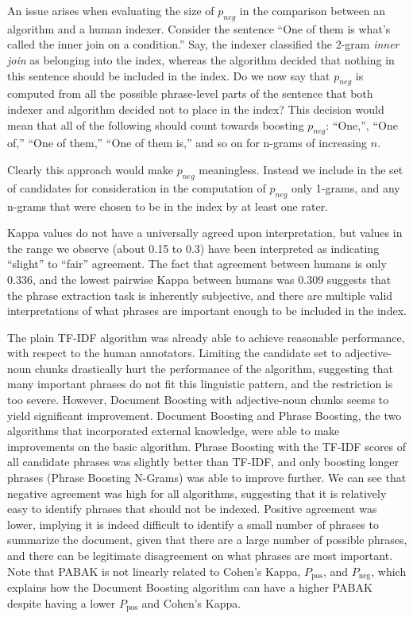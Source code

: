 An issue arises when evaluating the size of $p_{neg}$ in the
comparison between an algorithm and a human indexer. Consider the
sentence ``One of them is what's called the inner join on a
condition.'' Say, the indexer classified the 2-gram {\em inner join}
as belonging into the index, whereas the algorithm decided that
nothing in this sentence should be included in the index. Do we now
say that $p_{neg}$ is computed from all the possible phrase-level
parts of the sentence that both indexer and algorithm decided not to
place in the index? This decision would mean that all of the following
should count towards boosting $p_{neg}$: ``One,'', ``One of,'' ``One
of them,'' ``One of them is,'' and so on for n-grams of increasing
$n$.

Clearly this approach would make $p_{neg}$ meaningless. Instead we
include in the set of candidates for consideration in the computation
of $p_{neg}$ only 1-grams, and any n-grams that were chosen to be in
the index by at least one rater.

Kappa values do not have a universally agreed upon interpretation, but
values in the range we observe (about 0.15 to 0.3) have been
interpreted as indicating ``slight'' to ``fair'' agreement. The fact
that agreement between humans is only 0.336, and the lowest pairwise
Kappa between humans was 0.309 suggests that the phrase extraction
task is inherently subjective, and there are multiple valid
interpretations of what phrases are important enough to be included in
the index.

The plain TF-IDF algorithm was already able to achieve reasonable
performance, with respect to the human annotators. Limiting the
candidate set to adjective-noun chunks drastically hurt the
performance of the algorithm, suggesting that many important phrases
do not fit this linguistic pattern, and the restriction is too
severe. However, Document Boosting with adjective-noun chunks seems to
yield significant improvement. Document Boosting and Phrase Boosting, the two algorithms that
incorporated external knowledge, were able to make improvements on the
basic algorithm. Phrase Boosting with the TF-IDF scores of all
candidate phrases was slightly better than TF-IDF, and only boosting
longer phrases (Phrase Boosting N-Grams) was able to improve
further. We can see that negative agreement was high for all
algorithms, suggesting that it is relatively easy to identify phrases
that should not be indexed. Positive agreement was lower, implying it is indeed difficult to identify a small number of phrases to summarize the document, given that there are a large number of possible phrases, and there can be legitimate disagreement on what phrases are most important. Note that PABAK is not linearly related to Cohen's Kappa, $P_{\text{pos}}$, and $P_{\text{neg}}$, which explains how the Document Boosting algorithm can have a higher PABAK despite having a lower $P_{\text{pos}}$ and Cohen's Kappa.

